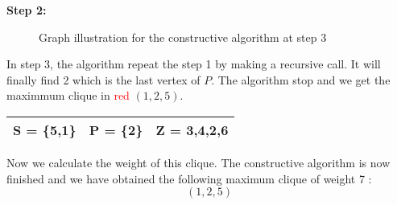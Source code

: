     \vspace{1\baselineskip}

    \begin{minipage}{\linewidth}
        \textbf{Step 2:} \newline
        \begin{minipage}{0.4\textwidth}
            \begin{figure}[H]
                \centering
                \caption{Graph illustration for the constructive algorithm at step 3}
                \label{fig:constructive-mewc-edge-step3}
            \end{figure}
        \end{minipage}
        \begin{minipage}{0.6\textwidth}
            In step 3, the algorithm repeat the step 1 by making a recursive call. It will finally find 2 which is the last vertex of $P$. The algorithm stop and we get the maximmum clique in \textcolor{red}{red} $(1,2,5)$.
    
            \begin{center}
                \begin{tabular}{|lll|}
                    \hline
                    S = \{5,1\} & P = \{2\} & Z = {3,4,2,6} \\
                    \hline
                \end{tabular}
            \end{center}
        \end{minipage}
    \end{minipage}

    \vspace{1\baselineskip}

    Now we calculate the weight of this clique. The constructive algorithm is now finished and we have obtained the following maximum clique of weight 7 : $$(1,2,5)$$

\newpage

